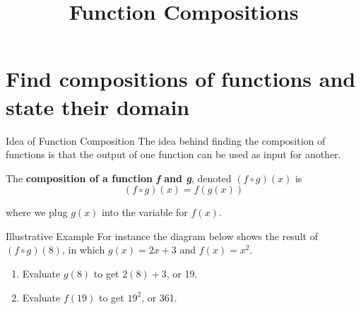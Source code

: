 \documentclass[t,usenames,dvipsnames]{beamer}
\title{Function Compositions}
\author{}
\date{}
\begin{document}
\begin{frame}
    \titlepage
\end{frame}

\section{Find compositions of functions and state their domain}

\begin{frame}{Idea of Function Composition}
The idea behind finding the composition of functions is that the output of one function can be used as input for another.   \newline\\  \pause

The \textbf{composition of a function \textit{f} and \textit{g}}, denoted $(f \circ g)(x)$ is
\[  (f \circ g)(x) = f(g(x))    \] 

where we plug $g(x)$ into the variable for $f(x)$.
\end{frame}

\begin{frame}{Illustrative Example}
For instance the diagram below shows the result of $(f \circ g)(8)$, in which $g(x)=2x+3$ and $f(x)=x^2$. \newline\\  \pause
\begin{enumerate}
    \item Evaluate $g(8)$ to get $2(8) + 3$, or 19. \newline\\  \pause
    \item Evaluate $f(19)$ to get $19^2$, or 361. \newline\\  \pause
\end{enumerate}

\begin{center}
\end{center}    
\end{frame}
\end{document}
